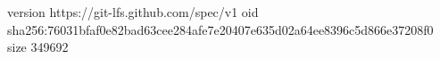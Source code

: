 version https://git-lfs.github.com/spec/v1
oid sha256:76031bfaf0e82bad63cee284afe7e20407e635d02a64ee8396c5d866e37208f0
size 349692
